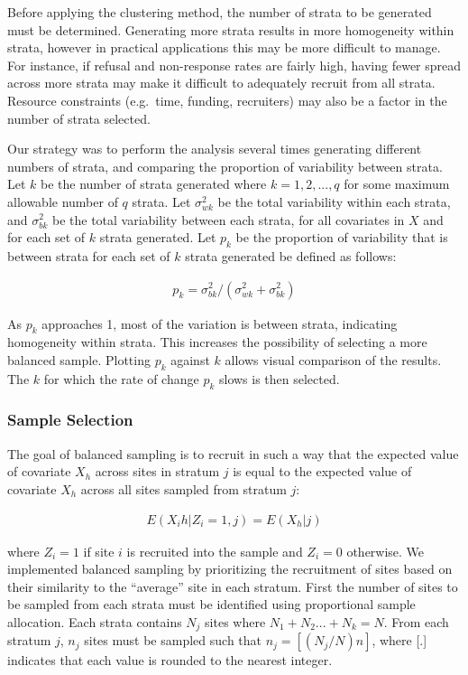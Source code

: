 \documentclass[man,floatsintext]{apa6}
\theoremstyle{definition}
\theoremstyle{definition}
\theoremstyle{definition}
\theoremstyle{remark}
\begin{document}
Before applying the clustering method, the number of strata to be
generated must be determined. Generating more strata results in more
homogeneity within strata, however in practical applications this may be
more difficult to manage. For instance, if refusal and non-response
rates are fairly high, having fewer spread across more strata may make
it difficult to adequately recruit from all strata. Resource constraints
(e.g.~time, funding, recruiters) may also be a factor in the number of
strata selected.

Our strategy was to perform the analysis several times generating
different numbers of strata, and comparing the proportion of variability
between strata. Let \(k\) be the number of strata generated where
\(k = 1, 2, ..., q\) for some maximum allowable number of \(q\) strata.
Let \(\sigma_{wk}^2\) be the total variability within each strata, and
\(\sigma_{bk}^2\) be the total variability between each strata, for all
covariates in \(X\) and for each set of \(k\) strata generated. Let
\(p_k\) be the proportion of variability that is between strata for each
set of \(k\) strata generated be defined as follows:

\begin{align} \label{eq:pk}
  p_k = \sigma_{bk}^2/(\sigma_{wk}^2 + \sigma_{bk}^2)
\end{align}

As \(p_k\) approaches 1, most of the variation is between strata,
indicating homogeneity within strata. This increases the possibility of
selecting a more balanced sample. Plotting \(p_k\) against \(k\) allows
visual comparison of the results. The \(k\) for which the rate of change
\(p_k\) slows is then selected.

\hypertarget{sample-selection}{%
\subsubsection{Sample Selection}\label{sample-selection}}

The goal of balanced sampling is to recruit in such a way that the
expected value of covariate \(X_h\) across sites in stratum \(j\) is
equal to the expected value of covariate \(X_h\) across all sites
sampled from stratum \(j\):

\begin{align}
  E(X_ih|Z_i = 1, j) = E(X_h|j)
\end{align}

where \(Z_i = 1\) if site \(i\) is recruited into the sample and
\(Z_i = 0\) otherwise. We implemented balanced sampling by prioritizing
the recruitment of sites based on their similarity to the
\enquote{average} site in each stratum. First the number of sites to be
sampled from each strata must be identified using proportional sample
allocation. Each strata contains \(N_j\) sites where
\(N_1 + N_2 ... + N_k = N\). From each stratum \(j\), \(n_j\) sites must
be sampled such that \(n_j = [(N_j/N)n]\), where {[}.{]} indicates that
each value is rounded to the nearest integer.
\end{document}
